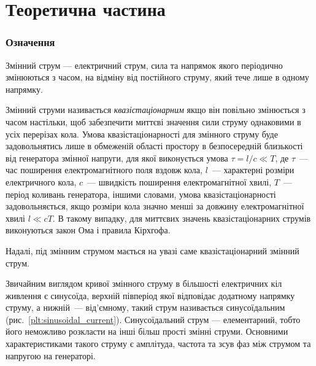 
\part{Теоретична частина}

\section{Означення}

Змінний струм --- електричний струм, сила та напрямок якого періодично змінюються з часом, на відміну від постійного струму, який тече лише в одному напрямку.

\noindent\bigskip%
\begin{More}

	Змінний струми називається \emph{квазістаціонарним} якщо він повільно змінюється з часом настільки, щоб забезпечити миттєві значення сили струму однаковими в усіх перерізах кола. Умова квазістаціонарності для змінного струму буде задовольнятись лише в обмеженій області простору в безпосередній близькості від генератора змінної напруги, для якої виконується умова $\tau = l/c \ll T$, де $\tau$~--- час поширення електромагнітного поля вздовж кола, $l$~--- характерні розміри електричного кола, $c$~--- швидкість поширення електромагнітної хвилі, $T$~--- період коливань генератора, іншими словами, умова квазістаціонарності задовольняється, якщо розміри кола значно менші за довжину електромагнітної хвилі $l \ll cT$. В такому випадку, для миттєвих значень квазістаціонарних струмів виконуються закон Ома і правила Кірхгофа.

	Надалі, під змінним струмом мається на увазі саме квазістаціонарний змінний струм.

\end{More}

Звичайним виглядом кривої змінного струму в більшості електричних кіл живлення є синусоїда, верхній півперіод якої відповідає додатному напрямку струму, а нижній~--- від'ємному, такий струм називається синусоїдальним (рис.~\ref{plt:sinusoidal_current}). Синусоїдальний струм --- елементарний, тобто його неможливо розкласти на інші більш прості змінні струми. Основними характеристиками такого струму є амплітуда, частота та зсув фаз між струмом та напругою на генераторі.

\begin{center}
    
	\label{plt:sinusoidal_current}
\end{center}

